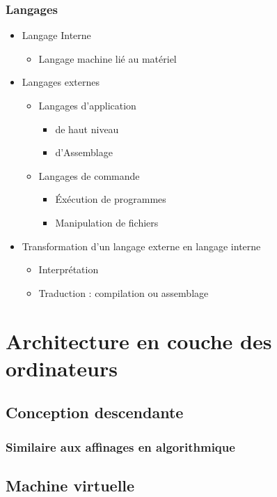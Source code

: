 			\subsubsection{Langages}
				\begin{itemize}
					\item[\textbullet] Langage Interne
					\begin{itemize}	
						\item Langage machine lié au matériel	
					\end{itemize}
					\item[\textbullet] Langages externes
						\begin{itemize}	
							\item Langages d'application
							\begin{itemize}
								\item[\textbullet] de haut niveau
								\item d'Assemblage
							\end{itemize}
							\item Langages de commande
							\begin{itemize}
								\item Éxécution de programmes 
								\item Manipulation de fichiers 
							\end{itemize}
						\end{itemize}
					\item[\textbullet] Transformation d'un langage externe en langage interne
						\begin{itemize}
							\item Interprétation
							\item Traduction : compilation ou assemblage
						\end{itemize}
						
				\end{itemize}
	\section{Architecture en couche des ordinateurs}
		\subsection{Conception descendante}
			\subsubsection{Similaire aux affinages en algorithmique}
		\subsection{Machine virtuelle}
